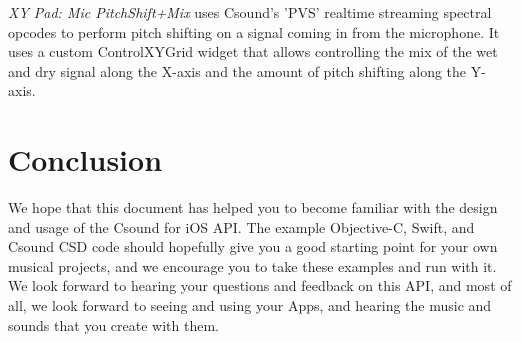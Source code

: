 \documentclass[11pt]{article}
\begin{document}
\emph{XY Pad: Mic PitchShift+Mix} uses Csound's 'PVS' realtime streaming spectral opcodes to perform pitch shifting on a signal coming in from the microphone.  It uses a custom ControlXYGrid widget that allows controlling the mix of the wet and dry signal along the X-axis and the amount of pitch shifting along the Y-axis.


\section{Conclusion}

We hope that this document has helped you to become familiar with the design and usage of the Csound for iOS API. The example Objective-C, Swift, and Csound CSD code should hopefully give you a good starting point for your own musical projects, and we encourage you to take these examples and run with it.  We look forward to hearing your questions and feedback on this API, and most of all, we look forward to seeing and using your Apps, and hearing the music and sounds that you create with them.
\end{document}
